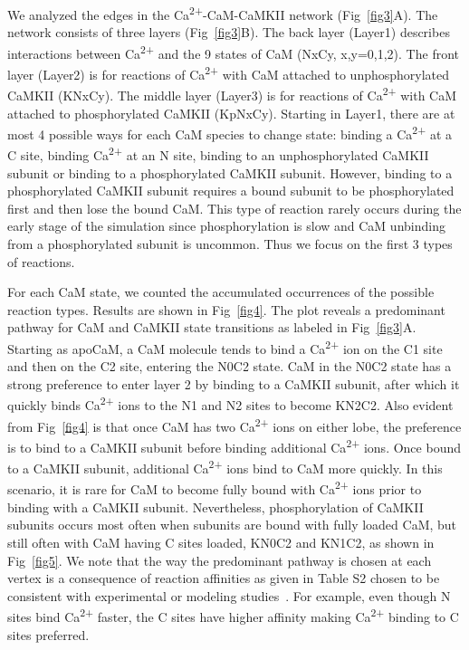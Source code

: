 \documentclass[10pt,letterpaper]{article}
\begin{document}
We analyzed the edges in the Ca\textsuperscript{2+}-CaM-CaMKII network (Fig~\ref{fig3}A). The network consists of three layers (Fig~\ref{fig3}B). The back layer (Layer1) describes interactions between Ca\textsuperscript{2+} and the 9 states of CaM (NxCy, x,y=0,1,2). The front layer (Layer2) is for reactions of Ca\textsuperscript{2+} with CaM attached to unphosphorylated CaMKII (KNxCy). The middle layer (Layer3) is for reactions of Ca\textsuperscript{2+} with CaM attached to phosphorylated CaMKII (KpNxCy). Starting in Layer1, there are at most 4 possible ways for each CaM species to change state: binding a Ca\textsuperscript{2+} at a C site, binding Ca\textsuperscript{2+} at an N site, binding to an unphosphorylated CaMKII subunit or binding to a phosphorylated CaMKII subunit. However, binding to a phosphorylated CaMKII subunit requires a bound subunit to be phosphorylated first and then lose the bound CaM. This type of reaction rarely occurs during the early stage of the simulation since phosphorylation is slow and CaM unbinding from a phosphorylated subunit is uncommon. Thus we focus on the first 3 types of reactions.

For each CaM state, we counted the accumulated occurrences of the possible reaction types. Results are shown in Fig~\ref{fig4}. The plot reveals a predominant pathway for CaM and CaMKII state transitions as labeled in Fig~\ref{fig3}A. Starting as apoCaM, a CaM molecule tends to bind a Ca\textsuperscript{2+} ion on the C1 site and then on the C2 site, entering the N0C2 state. CaM in the N0C2 state has a strong preference to enter layer 2 by binding to a CaMKII subunit, after which it quickly binds Ca\textsuperscript{2+} ions to the N1 and N2 sites to become KN2C2. Also evident from Fig~\ref{fig4} is that once CaM has two Ca\textsuperscript{2+} ions on either lobe, the preference is to bind to a CaMKII subunit before binding additional Ca\textsuperscript{2+} ions. Once bound to a CaMKII subunit, additional Ca\textsuperscript{2+} ions bind to CaM more quickly. In this scenario, it is rare for CaM to become fully bound with Ca\textsuperscript{2+} ions prior to binding with a CaMKII subunit. Nevertheless, phosphorylation of CaMKII subunits occurs most often when subunits are bound with fully loaded CaM, but still often with CaM having C sites loaded, KN0C2 and KN1C2, as shown in Fig~\ref{fig5}. We note that the way the predominant pathway is chosen at each vertex is a consequence of reaction affinities as given in Table S2 chosen to be consistent with experimental or modeling studies~\cite{Pepke:2010ju,Zeng:2010bq,Lucic:2008gt}. For example, even though N sites bind Ca\textsuperscript{2+} faster, the C sites have higher affinity making Ca\textsuperscript{2+} binding to C sites preferred. 
\end{document}
